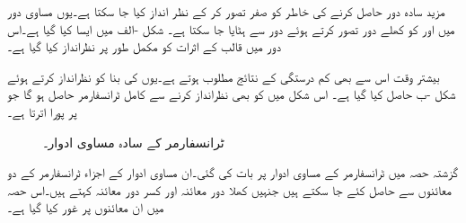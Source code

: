 مزید سادہ دور حاصل کرنے کی خاطر  کو صفر تصور کر کے  نظر انداز کیا جا  سکتا ہے۔یوں مساوی دور میں  اور  کو کھلے دور تصور کرتے ہوئے  دور سے  ہٹایا جا سکتا ہے۔ شکل -الف  میں ایسا کیا گیا ہے۔اس دور میں قالب کے اثرات کو مکمل طور پر نظرانداز کیا گیا ہے۔

بیشتر وقت  اس سے بھی کم درستگی کے نتائج مطلوب ہوتے ہے۔یوں  کی بنا   کو  نظرانداز کرتے ہوئے  شکل -ب حاصل کیا گیا ہے۔ اس شکل میں  کو بھی نظرانداز کرنے سے کامل ٹرانسفارمر حاصل ہو گا جو   پر پورا اترتا ہے۔


\begin{figure}
\centering
\caption{ٹرانسفارمر کے سادہ مساوی ادوار۔}
\label{شکل_ٹرانسفارمر_سادہ_ماڈل}
\end{figure}
گزشتہ حصہ میں  ٹرانسفارمر کے مساوی ادوار پر بات کی گئی۔ان مساوی ادوار  کے اجزاء ٹرانسفارمر کے دو معائنوں سے حاصل کئے جا سکتے ہیں جنہیں  کھلا دور معائنہ اور کسر دور معائنہ کہتے ہیں۔اس حصہ میں ان معائنوں پر غور کیا گیا ہے۔

